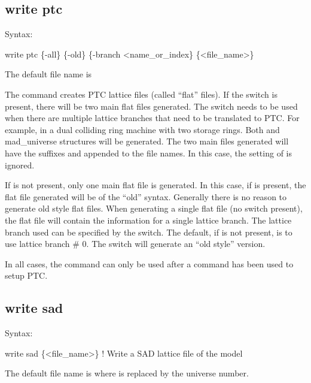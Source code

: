 {{{{{{{{{\subsection{write ptc}
\label{s:write.ptc}

Syntax:
\begin{example}
    write ptc \{-all\} \{-old\} \{-branch <name_or_index\} \{<file_name>\}
\end{example}

The default file name is 

The  command creates PTC lattice files (called ``flat'' files).  If the
 switch is present, there will be two main flat files generated. The 
switch needs to be used when there are multiple lattice branches that need to be
translated to PTC. For example, in a dual colliding ring machine with two storage rings.
Both  and  mad_universe structures will be generated. The two main files
generated will have the suffixes  and  appended to the file names. In
this case, the setting of  is ignored.

If  is not present, only one main flat file is generated. In this case, if
 is present, the flat file generated will be of the ``old'' syntax. Generally
there is no reason to generate old style flat files. When generating a single flat file
(no  switch present), the flat file will contain the information for a single
lattice branch. The lattice branch used can be specified by the  switch. The
default, if  is not present, is to use lattice branch \# 0. The 
switch will generate an ``old style'' version.

In all cases, the  command can only be used after a  command
has been used to setup PTC.


\subsection{write sad}
\label{s:write.sad}

Syntax:
\begin{example}
    write sad \{<file_name>\}  ! Write a SAD lattice file of the model
\end{example}

The default file name is  where \vn{\#} is replaced by the universe number. 

}}}}}}}}}
